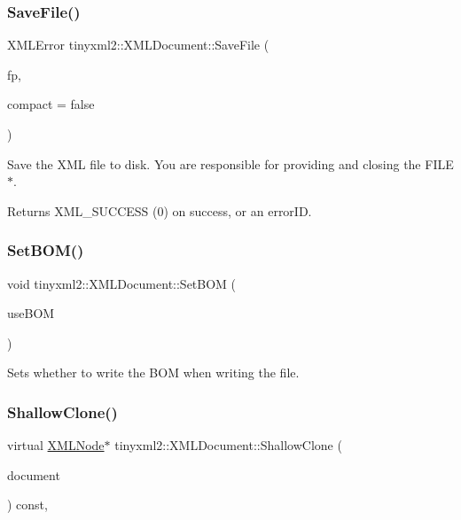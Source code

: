 \subsubsection{\texorpdfstring{SaveFile()}{SaveFile()}\hspace{0.1cm}{\footnotesize\ttfamily [2/2]}}
{\footnotesize\ttfamily X\+M\+L\+Error tinyxml2\+::\+X\+M\+L\+Document\+::\+Save\+File (\begin{DoxyParamCaption}\item[{F\+I\+LE $\ast$}]{fp,  }\item[{bool}]{compact = {\ttfamily false} }\end{DoxyParamCaption})}

Save the X\+ML file to disk. You are responsible for providing and closing the F\+I\+L\+E$\ast$.

Returns X\+M\+L\+\_\+\+S\+U\+C\+C\+E\+SS (0) on success, or an error\+ID. \mbox{\label{classtinyxml2_1_1XMLDocument_a14419b698f7c4b140df4e80f3f0c93b0}} 
\subsubsection{\texorpdfstring{SetBOM()}{SetBOM()}}
{\footnotesize\ttfamily void tinyxml2\+::\+X\+M\+L\+Document\+::\+Set\+B\+OM (\begin{DoxyParamCaption}\item[{bool}]{use\+B\+OM }\end{DoxyParamCaption})\hspace{0.3cm}{\ttfamily [inline]}}

Sets whether to write the B\+OM when writing the file. \mbox{\label{classtinyxml2_1_1XMLDocument_aa37cc1709d7e1e988bc17dcfb24a69b8}} 
\subsubsection{\texorpdfstring{ShallowClone()}{ShallowClone()}}
{\footnotesize\ttfamily virtual \mbox{\hyperlink{classtinyxml2_1_1XMLNode}{X\+M\+L\+Node}}$\ast$ tinyxml2\+::\+X\+M\+L\+Document\+::\+Shallow\+Clone (\begin{DoxyParamCaption}\item[{\mbox{\hyperlink{classtinyxml2_1_1XMLDocument}{X\+M\+L\+Document}} $\ast$}]{document }\end{DoxyParamCaption}) const\hspace{0.3cm}{\ttfamily [inline]}, {\ttfamily [virtual]}}

